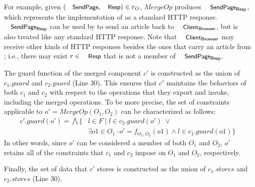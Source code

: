 For example, given $(\txtcname{SendPage}, \txtcname{Resp}) \in r_{O}$,
$MergeOp$ produces $\txtcname{SendPage}_{\textsf{Resp}}$, which
represents the implementation of  as a standard HTTP
response.  $\txtcname{SendPage}_{\textsf{Resp}}$ can be used by
 to send an article back to
$\txtcname{Client}_\textsf{Browser}$, but is also treated like any
standard HTTP response. Note that $\txtcname{Client}_\textsf{Browser}$
may receive other kinds of HTTP responses besides the ones that carry
an article from ; i.e., there may exist $r \in
\txtcname{Resp}$ that is not a member of $\txtcname{SendPage}_{\textsf{Resp}}$.

The guard function of the merged component $c'$ is constructed
as the union of $c_{1}.guard$ and $c_{2}.guard$ (Line 30). This ensures that $c'$
maintains the behaviors of both $c_{1}$ and $c_{2}$ with respect to the
operations that they export and invoke, including the merged
operations. To be more precise, the set of constraints applicable to $o' =
MergeOp(O_{1}, O_{2})$ can be characterized as follows:
\begin{align*}
c'.guard(o') = \bigwedge \{& l \in F \;|\; l \in c_{2}.guard(o') \; \lor \\
&\exists o1 \in O_{1} 
\cdot o' = f_{O_{1}, O_{2}}(o1) \land l \in c_{1}.guard(o1) \} 
\end{align*}
In other words, since $o'$ can be considered a member of both $O_{1}$ and
$O_{2}$, $o'$ retains all of the constraints that $c_{1}$ and $c_{2}$ impose
on $O_{1}$ and $O_{2}$, respectively. 

Finally, the set of data that $c'$ stores is constructed as the union
of $c_{1}.stores$ and $c_{2}.stores$ (Line 30).




